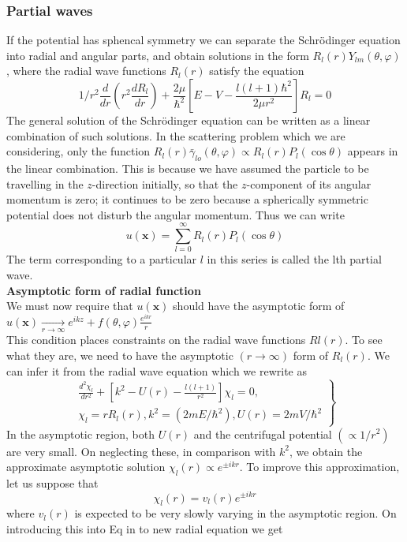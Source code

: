\subsubsection{Partial waves}
If the potential has sphencal symmetry we can separate the Schrödinger equation into radial and angular parts, and obtain solutions in the form $R_{l}(r) Y_{l m}{(\theta, \varphi)}$, where the radial wave functions $R_{l}(r)$ satisfy the equation
$$
1/r^2 \frac{d}{dr}\left(r^{2} \frac{d R_l}{d r}\right)+\frac{2 \mu}{\hbar^{2}}\left[E-V-\frac{l(l+1) \hbar^{2}}{2 \mu r^{2}}\right] R_l=0
$$
The general solution of the Schrödinger equation can be written as a linear combination of such solutions. In the scattering problem which we are considering, only the function $R_{l}(r) \bar{\gamma}_{l o}(\theta, \varphi) \propto R_{l}(r) P_{l}(\cos \theta)$ appears in the linear combination. This is because we have assumed the particle to be travelling in the $z$-direction initially, so that the $z$-component of its angular momentum is zero; it continues to be zero because a spherically symmetric potential does not disturb the angular momentum. Thus we can write
$$
u(\mathbf{x})=\sum_{l=0}^{\infty} R_{l}(r) P_{l}(\cos \theta)
$$
The term corresponding to a particular $l$ in this series is called the lth partial wave.\\
\textbf{Asymptotic form of radial function}\\
 We must now require that $u(\mathbf{x})$ should have the asymptotic form of$u(\mathbf{x}) \underset{r \rightarrow \infty}{\longrightarrow} e^{i k z}+f(\theta, \varphi) \frac{e^{i k r}}{r}$ \\
  This condition places constraints on the radial wave functions $R l(r)$. To see what they are, we need to have the asymptotic $(r \rightarrow \infty)$ form of $R_{l}(r)$. We can infer it from the radial wave equation  which we rewrite as
$$
\left.\begin{array}{l}
\frac{d^{2} \chi_{l}}{d r^{2}}+\left[k^{2}-U(r)-\frac{l(l+1)}{r^{2}}\right] \chi_{l}=0, \\
\chi_{l}=r R_{l}(r), k^{2}=\left(2 m E / \hbar^{2}\right), U(r)=2 m V / \hbar^{2}
\end{array}\right\}
$$
In the asymptotic region, both $U(r)$ and the centrifugal potential $\left(\propto 1 / r^{2}\right)$ are very small. On neglecting these, in comparison with $k^{2}$, we obtain the approximate asymptotic solution $\chi_{l}(r) \propto e^{\pm i k r}$. To improve this approximation, let us suppose that
$$\chi_{l}(r)=v_{l}(r) e^{\pm i k r}$$
where $v_{l}(r)$ is expected to be very slowly varying in the asymptotic region. On introducing this into Eq in to new radial equation we get
